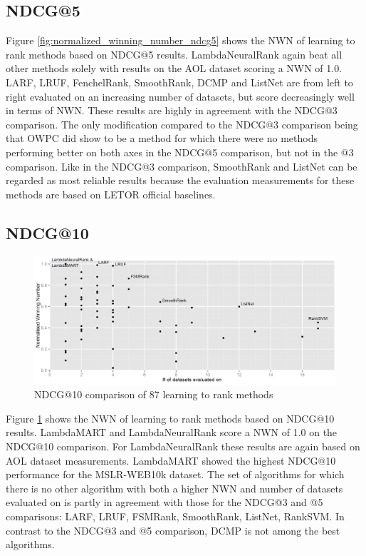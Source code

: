 \documentclass{sig-alternate}
\begin{document}
\subsection{NDCG@5}
Figure \ref{fig:normalized_winning_number_ndcg5} shows the NWN of learning to rank methods based on NDCG@5 results. LambdaNeuralRank again beat all other methods solely with results on the AOL dataset scoring a NWN of 1.0. LARF, LRUF, FenchelRank, SmoothRank, DCMP and ListNet are from left to right evaluated on an increasing number of datasets, but score decreasingly well in terms of NWN. These results are highly in agreement with the NDCG@3 comparison. The only modification compared to the NDCG@3 comparison being that OWPC did show to be a method for which there were no methods performing better on both axes in the NDCG@5 comparison, but not in the @3 comparison. Like in the NDCG@3 comparison, SmoothRank and ListNet can be regarded as most reliable results because the evaluation measurements for these methods are based on LETOR official baselines.

\subsection{NDCG@10}
\begin{figure}
\centering
\includegraphics[scale=0.19]{gfx/ndcg10_winnum}
\caption{NDCG@10 comparison of 87 learning to rank methods}
\label{fig:normalized_winning_number_ndcg10}
\end{figure}

Figure \ref{fig:normalized_winning_number_ndcg10} shows the NWN of learning to rank methods based on NDCG@10 results. LambdaMART and LambdaNeuralRank score a NWN of 1.0 on the NDCG@10 comparison. For LambdaNeuralRank these results are again based on AOL dataset measurements. LambdaMART showed the highest NDCG@10 performance for the MSLR-WEB10k dataset. The set of algorithms for which there is no other algorithm with both a higher NWN and number of datasets evaluated on is partly in agreement with those for the NDCG@3 and @5 comparisons: {LARF, LRUF, FSMRank, SmoothRank, ListNet, RankSVM}. In contrast to the NDCG@3 and @5 comparison, DCMP is not among the best algorithms.
\end{document}
